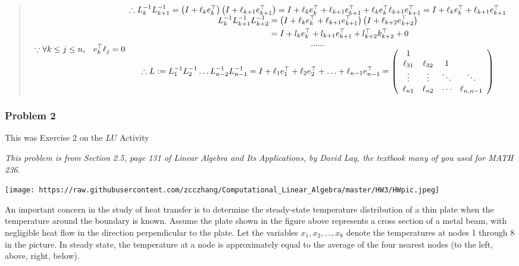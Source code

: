 \documentclass[]{article}
\begin{document}
\begin{quote}
\[
\because \forall k\leq j\leq n \text{, }\text{ }\text{ }e_{k}^{\top} \ell_{j}=0  \\
\begin{array}{c}\therefore {L_{k}^{-1} L_{k+1}^{-1}=\left(I+\ell_{k} e_{k}^{\top}\right)\left(I+\ell_{k+1} e_{k+1}^{\top}\right)=I+\ell_{k} e_{k}^{\top}+\ell_{k+1} e_{k+1}^{\top}+\ell_{k} e_{k}^{\top} \ell_{k+1} e_{k+1}^{\top}=I+\ell_{k} e_{k}^{\top}+\ell_{k+1} e_{k+1}^{\top}} \\ 
\begin{aligned} L_{k}^{-1} L_{k+1}^{-1} L_{k+2}^{-1} &=\left(I+\ell_{k} e_{k}^{\top}+\ell_{k+1} e_{k+1}^{\top}\right)\left(I+\ell_{k+2}e_{k+2}^{\top}\right) \\ &=I+l_{k} e_{k}^{\top}+l_{k+1} e_{k+1}^{\top}+l_{k+2}^{\top} k_{k+2}^{\top}+0 \end{aligned} \\
......\\
{\therefore L:=L_{1}^{-1} L_{2}^{-1} \ldots L_{n-2}^{-1} L_{n-1}^{-1}=I+\ell_{1} e_{1}^{\top}+\ell_{2} e_{2}^{\top}+\ldots+\ell_{n-1} e_{n-1}^{\top}=\left(\begin{array}{cccc}{1} & {} & {} & {} \\
{\ell_{31}} & {\ell_{32}} & {1} & {} \\ {\vdots} & {\vdots} & {\ddots} & {\ddots} \\ {\ell_{n 1}} & {\ell_{n 2}} & {\cdots} & {\ell_{n, n-1}}\end{array}\right)}\end{array}
\]
\end{quote}

\hypertarget{problem-2}{%
\subsubsection{Problem 2}\label{problem-2}}

This was Exercise 2 on the \(LU\) Activity

\emph{This problem is from Section 2.5, page 131 of Linear Algebra and
Its Applications, by David Lay, the textbook many of you used for MATH
236.}

\texttt{[image: https://raw.githubusercontent.com/zcczhang/Computational\_Linear\_Algebra/master/HW3/HWpic.jpeg]}

An important concern in the study of heat transfer is to determine the
steady-state temperature distribution of a thin plate when the
temperature around the boundary is known. Assume the plate shown in the
figure above represents a cross section of a metal beam, with negligible
heat flow in the direction perpendicular to the plate. Let the variables
\(x_1, x_2, \ldots, x_8\) denote the temperatures at nodes 1 through 8
in the picture. In steady state, the temperature at a node is
approximately equal to the average of the four nearest nodes (to the
left, above, right, below).
\end{document}
